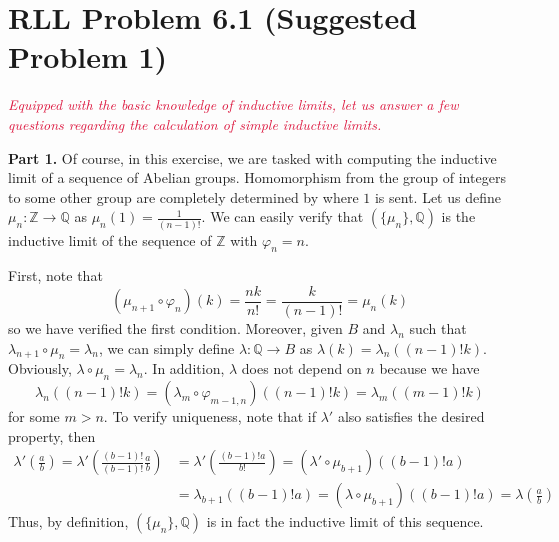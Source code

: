 \documentclass[aps,pra,showpacs,notitlepage,onecolumn,superscriptaddress,nofootinbib]{revtex4-1}
\newcommand{\pop}[1]{\textcolor{crimson}{#1}}
\newcommand{\hhrulefill}{\hspace{-1.0em}\hrulefill}
\theoremstyle{definition}
\begin{document}
\hhrulefill

\section{RLL Problem 6.1 (Suggested Problem 1)}

\noindent \emph{\pop{Equipped with the basic knowledge of inductive limits, let us answer a few questions regarding the calculation of simple inductive limits.}}
\newline

\noindent \textbf{Part 1.} Of course, in this exercise, we are tasked with computing the inductive limit of a sequence of Abelian groups.
Homomorphism from the group of integers to some other group are completely determined by where $1$ is sent. Let us define $\mu_n : \mathbb{Z} \rightarrow \mathbb{Q}$
as $\mu_n(1) = \frac{1}{(n - 1)!}$. We can easily verify that $(\{\mu_n\}, \mathbb{Q})$ is the inductive limit of the sequence of $\mathbb{Z}$ with $\varphi_n = n$.
\newline

\noindent First, note that
\begin{equation}
  (\mu_{n + 1} \circ \varphi_n)(k) = \frac{nk}{n!} = \frac{k}{(n - 1)!} = \mu_n(k)
\end{equation}
so we have verified the first condition. Moreover, given $B$ and $\lambda_n$ such that $\lambda_{n + 1} \circ \mu_n = \lambda_n$, we can simply define $\lambda : \mathbb{Q} \rightarrow B$ as
$\lambda(k) = \lambda_n((n - 1)! k)$. Obviously, $\lambda \circ \mu_n = \lambda_n$. In addition, $\lambda$ does not depend on $n$ because we have
\begin{equation}
 \lambda_n((n - 1)! k) = (\lambda_{m} \circ \varphi_{m - 1, n})((n - 1)! k) = \lambda_m((m - 1)! k)
\end{equation}
for some $m > n$. To verify uniqueness, note that if $\lambda'$ also satisfies the desired property, then
\begin{align}
  \lambda' \left( \frac{a}{b} \right) = \lambda' \left( \frac{(b - 1)!}{(b - 1)!} \frac{a}{b} \right) &= \lambda' \left( \frac{(b - 1)! a}{b!} \right) = (\lambda' \circ \mu_{b + 1})((b - 1)! a)
  \\ & = \lambda_{b + 1}((b - 1)! a) = (\lambda \circ \mu_{b + 1})((b - 1)! a) = \lambda \left( \frac{a}{b} \right)
\end{align}
Thus, by definition, $(\{\mu_n\}, \mathbb{Q})$ is in fact the inductive limit of this sequence.
\newline
\end{document}

